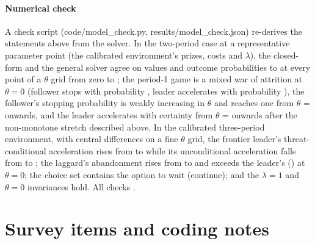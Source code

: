 \documentclass[preprint,12pt,authoryear]{elsarticle}
\begin{document}
\paragraph{Numerical check} A check script (code/model\_check.py, results/model\_check.json) re-derives the statements above from the solver. In the two-period case at a representative parameter point (the calibrated environment's prizes, costs and $\lambda$), the closed-form and the general solver agree on values and outcome probabilities to \ModelCheckTwoRouteGap{} at every point of a $\theta$ grid from zero to \ModelCheckThetaGridMax; the period-1 game is a mixed war of attrition at $\theta = 0$ (follower stops with probability \ModelCheckTwoPeriodQuitAtZero, leader accelerates with probability \ModelCheckTwoPeriodAccelAtZero), the follower's stopping probability is weakly increasing in $\theta$ and reaches one from $\theta$ = \ModelCheckThetaStar{} onwards, and the leader accelerates with certainty from $\theta$ = \ModelCheckThetaTwoStar{} onwards after the non-monotone stretch described above. In the calibrated three-period environment, with central differences on a fine $\theta$ grid, the frontier leader's threat-conditional acceleration rises from \ModelCheckLeaderAccelCondZero{} to \ModelCheckLeaderAccelCondSeven{} while its unconditional acceleration falls from \ModelCheckLeaderAccelUncondZero{} to \ModelCheckLeaderAccelUncondSeven; the laggard's abandonment rises from \ModelCheckLaggardQuitUncondZero{} to \ModelCheckLaggardQuitUncondSeven{} and exceeds the leader's (\ModelCheckLeaderQuitUncondZero) at $\theta = 0$; the choice set contains the option to wait (continue); and the $\lambda = 1$ and $\theta = 0$ invariances hold. All checks \ModelCheckAllPass.

\section{Survey items and coding notes}
\label{app:items}
\setcounter{table}{0}
\renewcommand{\thetable}{B.\arabic{table}}
\end{document}
